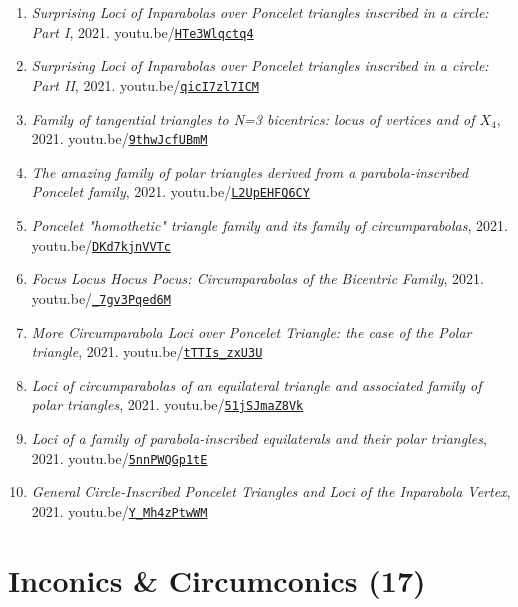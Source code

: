 \documentclass[12pt]{article}
\begin{document}
\begin{enumerate}[resume]
\item \textit{Surprising Loci of Inparabolas over Poncelet triangles inscribed in a circle: Part I}, 2021. youtu.be/\href{https://youtu.be/HTe3Wlqctq4}{\nolinkurl{HTe3Wlqctq4}}
\item \textit{Surprising Loci of Inparabolas over Poncelet triangles inscribed in a circle: Part II}, 2021. youtu.be/\href{https://youtu.be/qicI7zl7ICM}{\nolinkurl{qicI7zl7ICM}}
\item \textit{Family of tangential triangles to N=3 bicentrics: locus of vertices and of $X_{4}$}, 2021. youtu.be/\href{https://youtu.be/9thwJcfUBmM}{\nolinkurl{9thwJcfUBmM}}
\item \textit{The amazing family of polar triangles derived from a parabola-inscribed Poncelet family}, 2021. youtu.be/\href{https://youtu.be/L2UpEHFQ6CY}{\nolinkurl{L2UpEHFQ6CY}}
\item \textit{Poncelet "homothetic" triangle family and its family of circumparabolas}, 2021. youtu.be/\href{https://youtu.be/DKd7kjnVVTc}{\nolinkurl{DKd7kjnVVTc}}
\item \textit{Focus Locus Hocus Pocus: Circumparabolas of the Bicentric Family}, 2021. youtu.be/\href{https://youtu.be/_7gv3Pqed6M}{\nolinkurl{\_7gv3Pqed6M}}
\item \textit{More Circumparabola Loci over Poncelet Triangle: the case of the Polar triangle}, 2021. youtu.be/\href{https://youtu.be/tTTIs_zxU3U}{\nolinkurl{tTTIs\_zxU3U}}
\item \textit{Loci of circumparabolas of an equilateral triangle and associated family of polar triangles}, 2021. youtu.be/\href{https://youtu.be/51jSJmaZ8Vk}{\nolinkurl{51jSJmaZ8Vk}}
\item \textit{Loci of a family of parabola-inscribed equilaterals and their polar triangles}, 2021. youtu.be/\href{https://youtu.be/5nnPWQGp1tE}{\nolinkurl{5nnPWQGp1tE}}
\item \textit{General Circle-Inscribed Poncelet Triangles and Loci of the Inparabola Vertex}, 2021. youtu.be/\href{https://youtu.be/Y_Mh4zPtwWM}{\nolinkurl{Y\_Mh4zPtwWM}}
\end{enumerate}

\section{Inconics \& Circumconics (17)}
\end{document}
